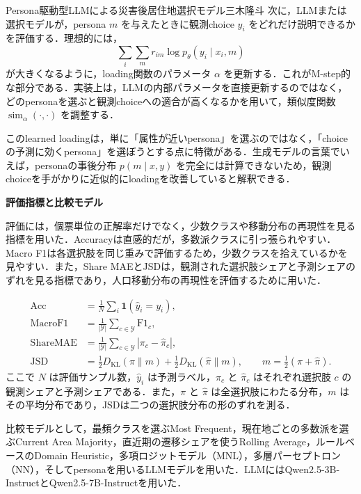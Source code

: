 \begin{column}{Persona駆動型LLMによる災害後居住地選択モデル}{三木隆斗}
次に，LLMまたは選択モデルが，persona \(m\) を与えたときに観測choice \(y_i\) をどれだけ説明できるかを評価する．理想的には，
\begin{equation}
\sum_i \sum_m r_{im}\log p_\theta(y_i\mid x_i,m)
\end{equation}
が大きくなるように，loading関数のパラメータ \(\alpha\) を更新する．これがM-step的な部分である．実装上は，LLMの内部パラメータを直接更新するのではなく，どのpersonaを選ぶと観測choiceへの適合が高くなるかを用いて，類似度関数 \(\operatorname{sim}_\alpha(\cdot,\cdot)\) を調整する．

このlearned loadingは，単に「属性が近いpersona」を選ぶのではなく，「choiceの予測に効くpersona」を選ぼうとする点に特徴がある．生成モデルの言葉でいえば，personaの事後分布 \(p(m\mid x,y)\) を完全には計算できないため，観測choiceを手がかりに近似的にloadingを改善していると解釈できる．

\medskip
\noindent
\textbf{評価指標と比較モデル}

評価には，個票単位の正解率だけでなく，少数クラスや移動分布の再現性を見る指標を用いた．Accuracyは直感的だが，多数派クラスに引っ張られやすい．Macro F1は各選択肢を同じ重みで評価するため，少数クラスを拾えているかを見やすい．また，Share MAEとJSDは，観測された選択肢シェアと予測シェアのずれを見る指標であり，人口移動分布の再現性を評価するために用いた．

\begin{align}
\mathrm{Acc}
&=
\frac{1}{N}\sum_i \mathbf{1}(\hat{y}_i=y_i),\\
\mathrm{MacroF1}
&=
\frac{1}{|\mathcal{Y}|}\sum_{c\in\mathcal{Y}}\mathrm{F1}_c,\\
\mathrm{ShareMAE}
&=
\frac{1}{|\mathcal{Y}|}\sum_{c\in\mathcal{Y}}|\pi_c-\hat{\pi}_c|,\\
\mathrm{JSD}
&=
\frac{1}{2}D_{\mathrm{KL}}(\pi\|m)
+
\frac{1}{2}D_{\mathrm{KL}}(\hat{\pi}\|m),
\qquad
m=\frac{1}{2}(\pi+\hat{\pi}).
\end{align}
ここで \(N\) は評価サンプル数，\(\hat{y}_i\) は予測ラベル，\(\pi_c\) と \(\hat{\pi}_c\) はそれぞれ選択肢 \(c\) の観測シェアと予測シェアである．また，\(\pi\) と \(\hat{\pi}\) は全選択肢にわたる分布，\(m\) はその平均分布であり，JSDは二つの選択肢分布の形のずれを測る．

比較モデルとして，最頻クラスを選ぶMost Frequent，現在地ごとの多数派を選ぶCurrent Area Majority，直近期の遷移シェアを使うRolling Average，ルールベースのDomain Heuristic，多項ロジットモデル（MNL），多層パーセプトロン（NN），そしてpersonaを用いるLLMモデルを用いた．LLMにはQwen2.5-3B-InstructとQwen2.5-7B-Instructを用いた．


\end{column}
